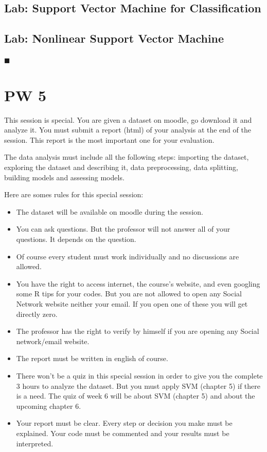 \documentclass[]{book}
\begin{document}
\section{Lab: Support Vector Machine for
Classification}\label{lab-support-vector-machine-for-classification}

\section{Lab: Nonlinear Support Vector
Machine}\label{lab-nonlinear-support-vector-machine}

◼

\chapter*{PW 5}\label{pw-5}

This session is special. You are given a dataset on moodle, go download
it and analyze it. You must submit a report (html) of your analysis at
the end of the session. This report is the most important one for your
evaluation.

The data analysis must include all the following steps: importing the
dataset, exploring the dataset and describing it, data preprocessing,
data splitting, building models and assessing models.

Here are somes rules for this special session:

\begin{itemize}
\item
  The dataset will be available on moodle during the session.
\item
  You can ask questions. But the professor will not answer all of your
  questions. It depends on the question.
\item
  Of course every student must work individually and no discussions are
  allowed.
\item
  You have the right to access internet, the course's website, and even
  googling some R tips for your codes. But you are not allowed to open
  any Social Network website neither your email. If you open one of
  these you will get directly zero.
\item
  The professor has the right to verify by himself if you are opening
  any Social network/email website.
\item
  The report must be written in english of course.
\item
  There won't be a quiz in this special session in order to give you the
  complete 3 hours to analyze the dataset. But you must apply SVM
  (chapter 5) if there is a need. The quiz of week 6 will be about SVM
  (chapter 5) and about the upcoming chapter 6.
\item
  Your report must be clear. Every step or decision you make must be
  explained. Your code must be commented and your results must be
  interpreted.
\end{itemize}
\end{document}
